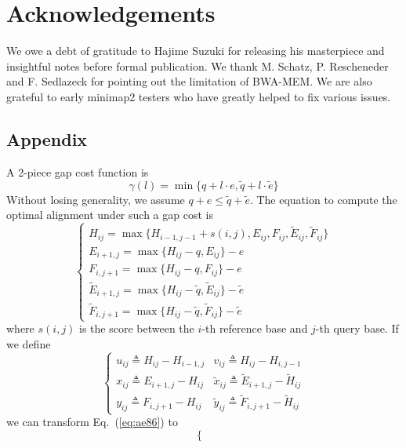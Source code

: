 \documentclass{bioinfo}
\begin{document}
\section*{Acknowledgements}
We owe a debt of gratitude to Hajime Suzuki for releasing his masterpiece and
insightful notes before formal publication. We thank M. Schatz, P. Rescheneder
and F.  Sedlazeck for pointing out the limitation of BWA-MEM. We are also
grateful to early minimap2 testers who have greatly helped to fix various
issues.



\pagebreak
\appendix

\begin{methods}
\section*{Appendix}
A 2-piece gap cost function is
\[
\gamma(l)=\min\{q+l\cdot e,\tilde{q}+l\cdot\tilde{e}\}
\]
Without losing generality, we assume $q+e\le\tilde{q}+\tilde{e}$. The equation
to compute the optimal alignment under such a gap cost is~\citep{Gotoh:1990aa}
\begin{equation}\label{eq:ae86}
\left\{\begin{array}{l}
H_{ij} = \max\{H_{i-1,j-1}+s(i,j),E_{ij},F_{ij},\tilde{E}_{ij},\tilde{F}_{ij}\}\\
E_{i+1,j}= \max\{H_{ij}-q,E_{ij}\}-e\\
F_{i,j+1}= \max\{H_{ij}-q,F_{ij}\}-e\\
\tilde{E}_{i+1,j}= \max\{H_{ij}-\tilde{q},\tilde{E}_{ij}\}-\tilde{e}\\
\tilde{F}_{i,j+1}= \max\{H_{ij}-\tilde{q},\tilde{F}_{ij}\}-\tilde{e}
\end{array}\right.
\end{equation}
where $s(i,j)$ is the score between the $i$-th reference base and $j$-th query
base. If we define
\[
\left\{\begin{array}{ll}
u_{ij}\triangleq H_{ij}-H_{i-1,j} & v_{ij}\triangleq H_{ij}-H_{i,j-1} \\
x_{ij}\triangleq E_{i+1,j}-H_{ij} & \tilde{x}_{ij}\triangleq \tilde{E}_{i+1,j}-\tilde{H}_{ij} \\
y_{ij}\triangleq F_{i,j+1}-H_{ij} & \tilde{y}_{ij}\triangleq \tilde{F}_{i,j+1}-\tilde{H}_{ij}
\end{array}\right.
\]
we can transform Eq.~(\ref{eq:ae86}) to
\begin{equation}\label{eq:suzuki}
\left\{\begin{array}{lll}

\end{array}
\end{equation}
\end{methods}
\end{document}

